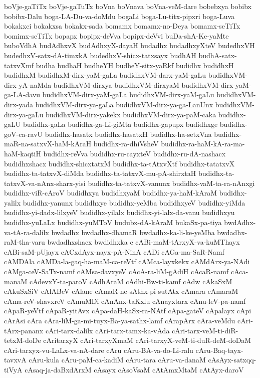 {boVje-gaTiTx
boVje-gaTuTx
boVna
boVnava
boVna-veM-dare
bobebxya
bobibx
bobibx-Dalu
boga-LA-Du-va-doMdu
bogaLi
boga-Lu-titx-pipxri
boga-Luva
bokakxci
bokakxsa
bokakx-sada
bomamx
bomamx-no-Deya
bomamx-seTiTx
bomimx-seTiTx
bopapx
bopipx-deVva
bopipx-deVvi
buDa-shA-Ke-yaMte
buboVdhA
budAdhxvX
budAdhxyX-dayaH
budadhx
budadhxyXteV
budedhxVH
budedhxV-satx-dA-timxkA
budedhxV-shicx-tatxsayx
budhAH
budhA-satx-tatxvXmf
budha
budhaH
budheYH
budheY-sitx-yaRkf
budidhx
budidhxH
budidhxM
budidhxM-dirx-yaM-gaLa
budidhxVM-darx-yaM-gaLu
budidhxVM-dirx-yA-naMda
budidhxVM-dirxya
budidhxVM-dirxyaM
budidhxVM-dirx-yaM-ga-LA-davu
budidhxVM-dirx-yaM-gaLa
budidhxVM-dirx-yaM-gaLu
budidhxVM-dirx-yada
budidhxVM-dirx-ya-gaLa
budidhxVM-dirx-ya-ga-LanUnx
budidhxVM-dirx-ya-gaLu
budidhxVM-dirx-yakekx
budidhxVM-dirx-ya-paM-caka
budidhx-gaLU
budidhx-gaLa
budidhx-ga-Li-giMta
budidhx-gapupx
budidhxge
budidhx-goV-ca-ravU
budidhx-hasatx
budidhx-hasatxH
budidhx-ha-setxVna
budidhx-maR-na-satxvX-haM-kAraH
budidhx-ra-dhiVsheV
budidhx-ra-haM-kA-ra-ma-haM-kaqtiH
budidhx-reVva
budidhx-ru-cayxteV
budidhx-ru-dA-nashacx
budidhxshacx
budidhx-shicxtatxM
budidhx-ta-tAtxvXtf
budidhx-tatatxvX
budidhx-ta-tatxvX-diMda
budidhx-ta-tatxvX-mu-pA-shirxtaH
budidhx-ta-tatxvX-va-nAnx-sharx-yisi
budidhx-ta-tatxvX-vanunx
budidhx-vaM-ta-ra-nAnxgi
budidhx-viR-cAroV
budidhxya
budidhxyaM
budidhx-ya-haM-kAraM
budidhx-yalilx
budidhx-yanunx
budidhxye
budidhx-yeMba
budidhxyeV
budidhx-yiMda
budidhx-yi-dadx-lilxyeV
budidhx-yilalx
budidhx-yi-lalx-da-vanu
budidhxyu
budidhx-yuLaLx
budidhx-yuMToV
budubx-dA-kAraM
bukaSx-pa-tiya
bwdAdhx-va-tA-ra-dalilx
bwdadhx
bwdadhx-dhamaR
bwdadhx-ka-li-ke-yeMba
bwdadhx-raM-tha-varu
bwdadhxshacx
bwdidhxka
c
cABi-maM-tArxyX-va-kuMThayx
cABi-saM-pUjayx
cACxdAyx-nayx-pA-NinA
cADi
cAGa-ma-SaR-Namf
cAMDAla
cAMDa-la-gaq-ha-maM-ca-reVtf
cAMca-layxkekx
cAMdArx-ya-NAdi
cAMga-ceV-SaTx-namf
cAMsa-davxyeV
cAcA-ra-liM-gAdiH
cAcaR-namf
cAca-manaM
cAdevxY-ta-paroV
cAdhAraM
cAdhi-Bw-ti-kamf
cAdw
cAkaSxM
cAkuSxSiV
cAlABeV
cAlane
cAmaR-ne-sAthx-pi-sutAtx
cAmara
cAmaraM
cAma-reV-shavxreV
cAmuMDi
cAnAnx-taKxlu
cAnayxtarx
cAnu-leV-pa-namf
cApaR-yeVtf
cApaR-yitAvx
cApa-daH-kaSx-ra-NAtf
cApa-gateV
cApalayx
cApi
cArAsi
cAra
cAra-liM-ga-mi-tuyx-Ba-ya-sathx-lamf
cArapArx
cAra-veMdu
cAri-tArx-pananx
cAri-tarx-dalilx
cAri-tarx-tamx-ka-vAda
cAri-tarx-veM-ti-diR-tetxM-doDe
cAritarxyX
cAri-tarxyXmaM
cAri-tarxyX-veM-ti-duR-deM-doDaM
cAri-tarxyx-vu-LaLx-va-nA-dare
cAru
cAru-BA-va-do-Li-ralu
cAru-Baq-tayx-tavxvA
cAru-kula
cAru-paM-ca-kadiM
cAru-tara
cAru-va-danaM
cAsAyx-satxqq-tiVyA
cAsaq-ja-daBxdArxM
cAsayx
cAsoVsaM
cAtAmxMtaM
cAtAyx-daroV
}
